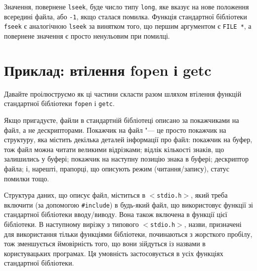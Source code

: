 \documentclass[a4paper,12pt]{book}
\begin{document}
  Значення, повернене \texttt{lseek}, буде число типу \texttt{long}, яке вказує на нове
  положення всередині файла, або \texttt{-1}, якщо сталася помилка. Функція стандартної
  бібліотеки \texttt{fseek} є аналогічною \texttt{lseek} за винятком того, що першим
  аргументом є \texttt{FILE *}, а повернене значення є просто ненульовим при помилці.

\section{Приклад: втілення fopen і getc}

\label{f0:ch8.5}
  Давайте проілюструємо як ці частини скласти разом шляхом втілення функцій стандартної
  бібліотеки \texttt{fopen} і \texttt{getc}.

  Якщо пригадуєте, файли в стандартній бібліотеці описано за покажчиками на файл, а не
  дескрипторами. Покажчик на файл "--- це просто покажчик на структуру, яка містить
  декілька деталей інформації про файл: покажчик на буфер, тож файл можна читати великими
  відрізками; відлік кількості знаків, що залишились у буфері; покажчик на наступну
  позицію знака в буфері; дескриптор файла; і, нарешті, прапорці, що описують режим
  (читання/запису), статус помилки тощо.

  Структура даних, що описує файл, міститься в \texttt{\mbox{$<$}stdio.h\mbox{$>$}}, який треба
  включити (за допомогою \texttt{\#include}) в будь-який файл, що використовує функції зі
  стандартної бібліотеки вводу/виводу. Вона також включена в функції цієї бібліотеки. В
  наступному вирізку з типового \texttt{\mbox{$<$}stdio.h\mbox{$>$}}, назви, призначені для
  використання тільки функціями бібліотеки, починаються з жорсткого пробілу, тож
  зменшується ймовірність того, що вони зійдуться із назвами в користувацьких програмах.
  Ця умовність застосовується в усіх функціях стандартної бібліотеки.
\end{document}
